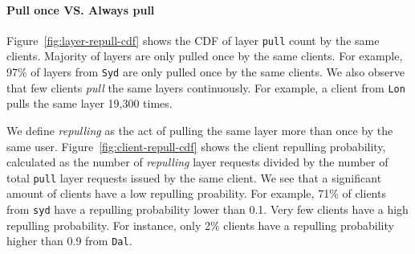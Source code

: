 \paragraph{Pull once VS. Always pull} Figure~\ref{fig:layer-repull-cdf} shows
the CDF of layer \texttt{pull} count by the same clients. 
Majority of layers are only pulled once by the same clients.
For example, 97\% of layers from \texttt{Syd} are only pulled once by the same
clients.  We also observe that few clients \emph{pull} the same layers
continuously.  For example, a client from \texttt{Lon} pulls the same layer
19,300 times.

We define \emph{repulling} as the act of pulling the same layer more than once
by the same user.
Figure~\ref{fig:client-repull-cdf} shows the client repulling probability,
calculated as the number of \emph{repulling} layer requests divided by the
number of total \texttt{pull} layer requests issued by the same client.  We see
that a significant amount of clients have a low repulling proability.  For
example, 71\% of clients from \texttt{syd} have a repulling probability lower
than 0.1.  Very few clients have a high repulling probability.  For instance,
only 2\% clients have a repulling probability higher than 0.9 from
\texttt{Dal}.

